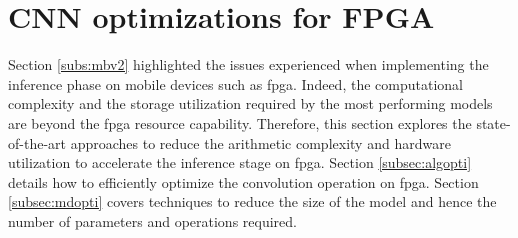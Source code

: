 \section{CNN optimizations for FPGA} \label{sec:opti_cnn}
%
%
Section \ref{subs:mbv2} highlighted the issues experienced when implementing the inference phase on mobile devices such as \acrshort{fpga}. Indeed, the computational complexity and the storage utilization required by the most performing models are beyond the \acrshort{fpga} resource capability. Therefore, this section explores the state-of-the-art approaches to reduce the arithmetic complexity and hardware utilization to accelerate the inference stage on \acrshort{fpga}. Section \ref{subsec:algopti} details how to efficiently optimize the convolution operation on \acrshort{fpga}. Section \ref{subsec:mdopti} covers techniques to reduce the size of the model and hence the number of parameters and operations required.
%

%

